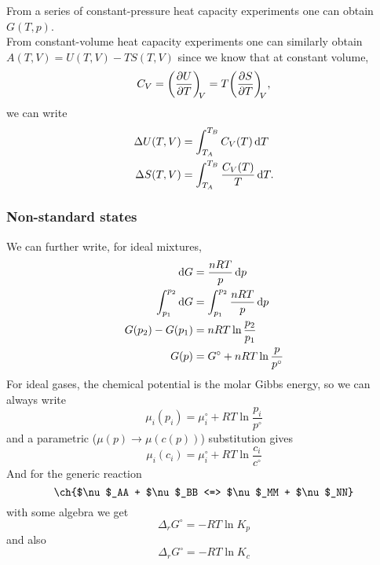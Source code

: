From a series of constant-pressure heat capacity experiments one can obtain $G(T,p)$. \\
From constant-volume heat capacity experiments one can similarly obtain $A(T,V)=U(T,V)-TS(T,V)$ since we know that at constant volume,
\begin{equation}
C_V=\diffp UT[V]=T\diffp ST[V],
\end{equation}
we can write 
\begin{subequations}
\begin{align}
\Delta U(T,V)&=\int^{T_B}_{T_A}C_V(T)\dif T \\
\Delta S(T,V)&=\int^{T_B}_{T_A}\frac{C_V(T)}{T}\dif T.
\end{align}
\end{subequations}
\subsubsection{Non-standard states}
We can further write, for ideal mixtures,
\begin{equation}
\begin{aligned}
  \dif G&=\frac{nRT}{p}\dif p\\
  \int^{p_2}_{p_1}\dif G&=\int^{p_2}_{p_1}\frac{nRT}{p}\dif p\\
  G(p_2)-G(p_1)&=nRT\ln\frac{p_2}{p_1}\\
  G(p)&=G^{\circ}+nRT\ln\frac{p}{p^{\circ}}
\end{aligned}
\end{equation}
For ideal gases, the chemical potential is the molar Gibbs energy, so we can always write
\begin{equation}
  \mu_i(p_i)=\mu_i^{\circ}+RT\ln\frac{p_i}{p^{\circ}}
\end{equation}
and a parametric ($\mu(p)\rightarrow\mu(c(p))$) substitution gives
\begin{equation}
  \mu_i(c_i)=\mu_i^{\circ}+RT\ln\frac{c_i}{c^{\circ}}
\end{equation}
And for the generic reaction
\begin{equation}
  \ch{$\nu$_AA + $\nu$_BB <=> $\nu$_MM + $\nu$_NN}
\end{equation}
with some algebra we get
\begin{equation}
\label{stdgibbsp}
  \Delta_rG^{\circ}=-RT\ln K_p
\end{equation}
and also
\begin{equation}
\label{stdgibbsc}
  \Delta_rG^{\circ}=-RT\ln K_c
\end{equation}
